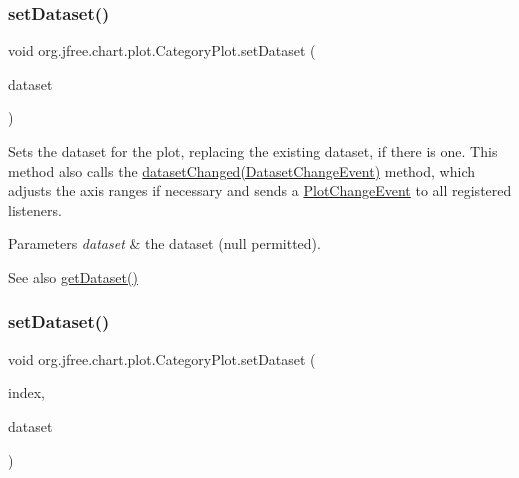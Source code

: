 \subsubsection{\texorpdfstring{set\+Dataset()}{setDataset()}\hspace{0.1cm}{\footnotesize\ttfamily [1/2]}}
{\footnotesize\ttfamily void org.\+jfree.\+chart.\+plot.\+Category\+Plot.\+set\+Dataset (\begin{DoxyParamCaption}\item[{\mbox{\hyperlink{interfaceorg_1_1jfree_1_1data_1_1category_1_1_category_dataset}{Category\+Dataset}}}]{dataset }\end{DoxyParamCaption})}

Sets the dataset for the plot, replacing the existing dataset, if there is one. This method also calls the \mbox{\hyperlink{classorg_1_1jfree_1_1chart_1_1plot_1_1_category_plot_a18c1d4bbfe9b7646dc1e51246e5c11ff}{dataset\+Changed(\+Dataset\+Change\+Event)}} method, which adjusts the axis ranges if necessary and sends a \mbox{\hyperlink{}{Plot\+Change\+Event}} to all registered listeners.


\begin{DoxyParams}{Parameters}
{\em dataset} & the dataset ({\ttfamily null} permitted).\\
\hline
\end{DoxyParams}
\begin{DoxySeeAlso}{See also}
\mbox{\hyperlink{classorg_1_1jfree_1_1chart_1_1plot_1_1_category_plot_aef991a0f3a5792964fc797125f53601d}{get\+Dataset()}} 
\end{DoxySeeAlso}
\mbox{\label{classorg_1_1jfree_1_1chart_1_1plot_1_1_category_plot_adae0139eeab71b8c67ae9f7e219a9175}} 
\subsubsection{\texorpdfstring{set\+Dataset()}{setDataset()}\hspace{0.1cm}{\footnotesize\ttfamily [2/2]}}
{\footnotesize\ttfamily void org.\+jfree.\+chart.\+plot.\+Category\+Plot.\+set\+Dataset (\begin{DoxyParamCaption}\item[{int}]{index,  }\item[{\mbox{\hyperlink{interfaceorg_1_1jfree_1_1data_1_1category_1_1_category_dataset}{Category\+Dataset}}}]{dataset }\end{DoxyParamCaption})}

